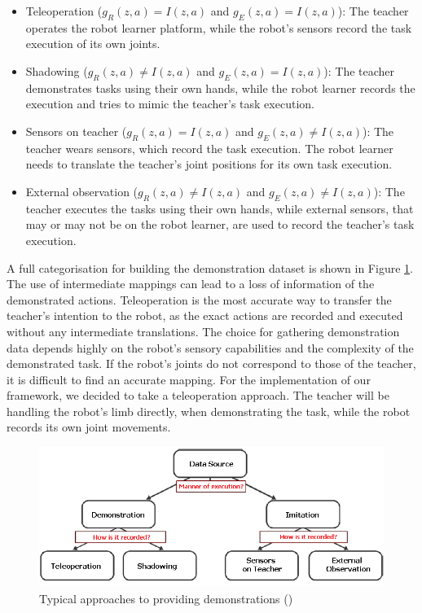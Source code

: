 \begin{itemize}
\item Teleoperation ($g_R(z,a) = I(z,a)$ and $g_E(z,a) = I(z,a)$): The teacher operates the robot learner platform, while the robot's sensors record the task execution of its own joints.
\item Shadowing ($g_R(z,a) \neq I(z,a)$ and $g_E(z,a) = I(z,a)$): The teacher demonstrates tasks using their own hands, while the robot learner records the execution and tries to mimic the teacher's task execution.
\item Sensors on teacher  ($g_R(z,a) = I(z,a)$ and $g_E(z,a) \neq I(z,a)$): The teacher wears sensors, which record the task execution.
 The robot learner needs to translate the teacher's joint positions for its own task execution.
\item External observation  ($g_R(z,a) \neq I(z,a)$ and $g_E(z,a) \neq I(z,a)$): The teacher executes the tasks using their own hands, while external sensors, that may or may not be on the robot learner, are used to record the teacher's task execution.
\end{itemize}

A full categorisation for building the demonstration dataset is shown in Figure \ref{fig:Gathering demonstrations2}.
 The use of intermediate mappings can lead to a loss of information of the demonstrated actions.
 Teleoperation is the most accurate way to transfer the teacher's intention to the robot, as the exact actions are recorded and executed without any intermediate translations.
 The choice for gathering demonstration data depends highly on the robot's sensory capabilities and the complexity of the demonstrated task.
 If the robot's joints do not correspond to those of the teacher, it is difficult to find an accurate mapping.
 For the implementation of our framework, we decided to take a teleoperation approach.
 The teacher will be handling the robot's limb directly, when demonstrating the task, while the robot records its own joint movements.

  \begin{figure}[ht]
    \centering
    \includegraphics[scale=0.6]{figures/Gathering3}
    \caption{Typical approaches to providing demonstrations (\cite{argall2009survey})}
    \label{fig:Gathering demonstrations2}
  \end{figure}


